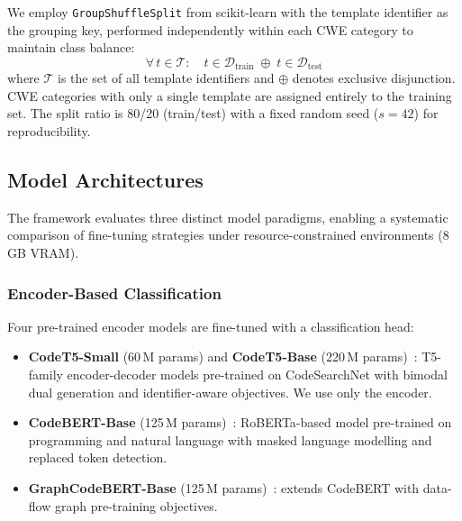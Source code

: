 We employ \texttt{GroupShuffleSplit} from scikit-learn with the template
identifier as the grouping key, performed independently within each CWE
category to maintain class balance:
\begin{equation}
    \forall\, t \in \mathcal{T}: \quad t \in \mathcal{D}_{\text{train}}
    \;\oplus\; t \in \mathcal{D}_{\text{test}}
\label{eq:template_split}
\end{equation}
where $\mathcal{T}$ is the set of all template identifiers and $\oplus$
denotes exclusive disjunction.  CWE categories with only a single template
are assigned entirely to the training set.  The split ratio is 80/20
(train/test) with a fixed random seed ($s = 42$) for reproducibility.

\subsection{Model Architectures}
\label{sec:model}

The framework evaluates three distinct model paradigms, enabling a
systematic comparison of fine-tuning strategies under resource-constrained
environments (8\,GB VRAM).

\subsubsection{Encoder-Based Classification}
Four pre-trained encoder models are fine-tuned with a classification head:

\begin{itemize}
    \item \textbf{CodeT5-Small} (60\,M params) and \textbf{CodeT5-Base}
          (220\,M params)~\cite{wang2021codet5}: T5-family encoder-decoder
          models pre-trained on CodeSearchNet with bimodal dual generation
          and identifier-aware objectives.  We use only the encoder.
    \item \textbf{CodeBERT-Base} (125\,M params)~\cite{feng2020codebert}:
          RoBERTa-based model pre-trained on programming and natural
          language with masked language modelling and replaced token
          detection.
    \item \textbf{GraphCodeBERT-Base} (125\,M params)~\cite{guo2020graphcodebert}:
          extends CodeBERT with data-flow graph pre-training objectives.
\end{itemize}

